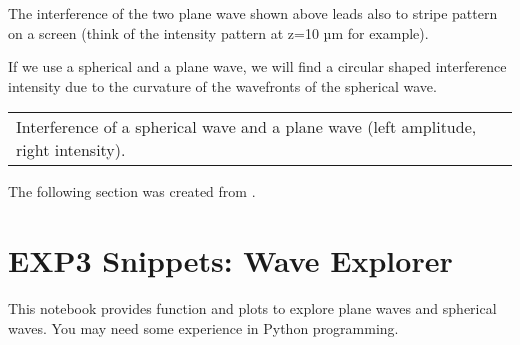 \documentclass[letterpaper,10pt,english]{sphinxmanual}
\begin{document}
The interference of the two plane wave shown above leads also to stripe pattern on a screen (think of the intensity pattern at z=10 µm for example).

If we use a spherical and a plane wave, we will find a circular shaped interference intensity due to the curvature of the wavefronts of the spherical wave.


\begin{savenotes}\sphinxattablestart
\centering
\begin{tabulary}{\linewidth}[t]{|T|}
\hline
\sphinxstyletheadfamily 
{}
\\
\hline
{} Interference of a spherical wave and a plane wave (left amplitude, right intensity).
\\
\hline
\end{tabulary}
\par
\sphinxattableend\end{savenotes}

The following section was created from .


\section{EXP3 Snippets: Wave Explorer}
\label{\detokenize{snippets/Wave Explorer:EXP3-Snippets:-Wave-Explorer}}\label{\detokenize{snippets/Wave Explorer::doc}}
This notebook provides function and plots to explore plane waves and spherical waves. You may need some experience in Python programming.
\end{document}

